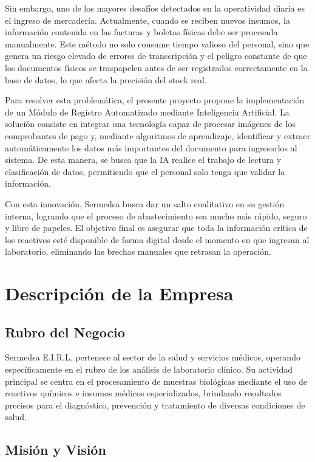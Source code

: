 \documentclass[12pt,a4paper]{article}
\begin{document}
Sin embargo, uno de los mayores desafíos detectados en la operatividad diaria es el ingreso de mercadería. Actualmente, cuando se reciben nuevos insumos, la información contenida en las facturas y boletas físicas debe ser procesada manualmente. Este método no solo consume tiempo valioso del personal, sino que genera un riesgo elevado de errores de transcripción y el peligro constante de que los documentos físicos se traspapelen antes de ser registrados correctamente en la base de datos, lo que afecta la precisión del stock real.

Para resolver esta problemática, el presente proyecto propone la implementación de un Módulo de Registro Automatizado mediante Inteligencia Artificial. La solución consiste en integrar una tecnología capaz de procesar imágenes de los comprobantes de pago y, mediante algoritmos de aprendizaje, identificar y extraer automáticamente los datos más importantes del documento para ingresarlos al sistema. De esta manera, se busca que la IA realice el trabajo de lectura y clasificación de datos, permitiendo que el personal solo tenga que validar la información.

Con esta innovación, Sermedsa busca dar un salto cualitativo en su gestión interna, logrando que el proceso de abastecimiento sea mucho más rápido, seguro y libre de papeles. El objetivo final es asegurar que toda la información crítica de los reactivos esté disponible de forma digital desde el momento en que ingresan al laboratorio, eliminando las brechas manuales que retrasan la operación.

\setcounter{section}{0}
\section{Descripción de la Empresa}

\subsection{Rubro del Negocio}

Sermedsa E.I.R.L. pertenece al sector de la salud y servicios médicos, operando específicamente en el rubro de los análisis de laboratorio clínico. Su actividad principal se centra en el procesamiento de muestras biológicas mediante el uso de reactivos químicos e insumos médicos especializados, brindando resultados precisos para el diagnóstico, prevención y tratamiento de diversas condiciones de salud.

\subsection{Misión y Visión}
\end{document}
